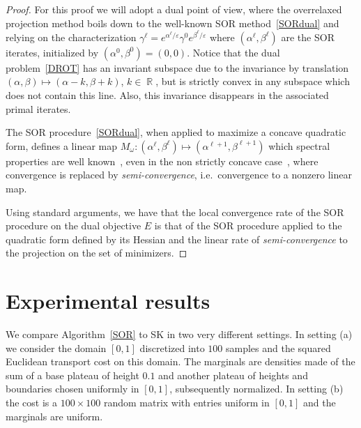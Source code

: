 \documentclass{article} %
\DeclareMathOperator{\IR}{\mathbb{R}}
\renewcommand{\epsilon}{\varepsilon}
\theoremstyle{plain}
\theoremstyle{definition}
\theoremstyle{remark}
\begin{document}
\begin{proof}
For this proof we will adopt a dual point of view, where the overrelaxed projection method boils down to the well-known SOR method~\eqref{SORdual} and relying on the characterization $\gamma^{\ell}=e^{\alpha^\ell/\epsilon}\gamma^0 e^{\beta^\ell/\epsilon}$ where $(\alpha^\ell,\beta^\ell)$ are the SOR iterates, initialized by $(\alpha^0,\beta^0)=(0,0)$. Notice that the dual problem~\eqref{DROT} has an invariant subspace due to the invariance by translation $(\alpha,\beta)\mapsto (\alpha-k,\beta+k)$, $k\in \IR$, but is strictly convex in any subspace which does not contain this line. Also, this invariance disappears in the associated primal iterates. 

The SOR procedure~\eqref{SORdual}, when applied to maximize a concave quadratic form, defines a linear map $M_\omega : (\alpha^{\ell},\beta^{\ell})\mapsto (\alpha^{\ell+1},\beta^{\ell+1})$ which spectral properties are well known~\cite{ciarlet1982introduction, young2014iterative}, even in the non strictly concave case~\cite{hadjidimos1985optimization}, where convergence is replaced by \emph{semi-convergence}, i.e.\ convergence to a nonzero linear map.

Using standard arguments, we have that the local convergence rate of the SOR procedure on the dual objective $E$ is that of the SOR procedure applied to the quadratic form defined by its Hessian and the linear rate of \emph{semi-convergence} to the projection on the set of minimizers. 
\end{proof}




    

\section{Experimental results}
We compare Algorithm~\ref{SOR} to SK in two very different settings. 
In setting (a) we consider the domain $[0,1]$ discretized into $100$ samples and the squared Euclidean transport cost on this domain. 
The marginals are densities made of the sum of a base plateau of height $0.1$ and another plateau of heights and boundaries chosen uniformly in $[0,1]$, subsequently normalized.
In setting (b) the cost is a $100\times 100$ random matrix with entries uniform in $[0,1]$ and the marginals are uniform.
\end{document}
